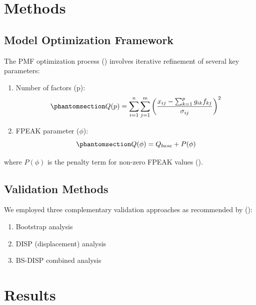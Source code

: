 \documentclass[
  letterpaper,
  oneside,
  openany]{MastersDoctoralThesis}
\providecommand{\tightlist}{%
  \setlength{\itemsep}{0pt}\setlength{\parskip}{0pt}}\usepackage{longtable,booktabs,array}
\begin{document}
\section{Methods}\label{methods}

\subsection{Model Optimization
Framework}\label{model-optimization-framework}

The PMF optimization process ()
involves iterative refinement of several key parameters:

\begin{enumerate}
\def\labelenumi{\arabic{enumi}.}
\item
  Number of factors (p):
  \begin{equation}\phantomsection\label{eq-pmf-opt}{Q(p) = \sum_{i=1}^{n} \sum_{j=1}^{m} \left(\frac{x_{ij} - \sum_{k=1}^{p} g_{ik}f_{kj}}{\sigma_{ij}}\right)^2}\end{equation}
\item
  FPEAK parameter (\(\phi\)):
  \begin{equation}\phantomsection\label{eq-pmf-fpeak}{Q(\phi) = Q_{base} + P(\phi)}\end{equation}
\end{enumerate}

where \(P(\phi)\) is the penalty term for non-zero FPEAK values
().

\subsection{Validation Methods}\label{validation-methods}

We employed three complementary validation approaches as recommended by
():

\begin{enumerate}
\def\labelenumi{\arabic{enumi}.}
\tightlist
\item
  Bootstrap analysis
\item
  DISP (displacement) analysis
\item
  BS-DISP combined analysis
\end{enumerate}

\section{Results}\label{results}
\end{document}
